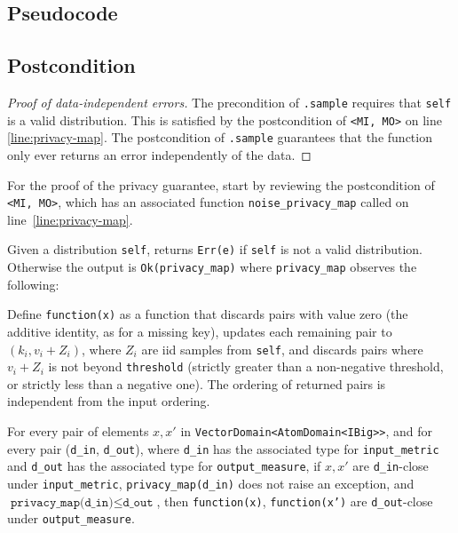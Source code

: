 \documentclass{article}
\begin{document}
\subsection*{Pseudocode}


\subsection*{Postcondition}
\begin{theorem}
\end{theorem}

\begin{proof}[Proof of data-independent errors]
    The precondition of \texttt{.sample} requires that \texttt{self} is a valid distribution.
    This is satisfied by the postcondition of \texttt{<MI, MO>} on line \ref{line:privacy-map}.
    The postcondition of \texttt{.sample} guarantees that the function only ever returns an error independently of the data.
\end{proof}

For the proof of the privacy guarantee, start by reviewing the postcondition of \texttt{<MI, MO>}, 
which has an associated function \texttt{noise\_privacy\_map} called on line~\ref{line:privacy-map}.
\begin{lemma}
    \label{lemma:new-privacy-map}
    Given a distribution \texttt{self},
    returns \texttt{Err(e)} if \texttt{self} is not a valid distribution.
    Otherwise the output is \texttt{Ok(privacy\_map)}
    where \texttt{privacy\_map} observes the following:

    Define \texttt{function(x)} as a function that discards pairs with value zero (the additive identity, as for a missing key),
    updates each remaining pair to $(k_i, v_i + Z_i)$,
    where $Z_i$ are iid samples from \texttt{self},
    and discards pairs where $v_i + Z_i$ is not beyond \texttt{threshold}
    (strictly greater than a non-negative threshold, or strictly less than a negative one).
    The ordering of returned pairs is independent from the input ordering.

    For every pair of elements $x, x'$ in \texttt{VectorDomain<AtomDomain<IBig>{}>},
    and for every pair (\texttt{d\_in}, \texttt{d\_out}),
    where \texttt{d\_in} has the associated type for \texttt{input\_metric} and \texttt{d\_out} has the associated type for \texttt{output\_measure},
    if $x, x'$ are \texttt{d\_in}-close under \texttt{input\_metric}, \texttt{privacy\_map(d\_in)} does not raise an exception,
    and $\texttt{privacy\_map(d\_in)} \leq \texttt{d\_out}$,
    then \texttt{function(x)}, \texttt{function(x')} are \texttt{d\_out}-close under \texttt{output\_measure}.
\end{lemma}
\end{document}
